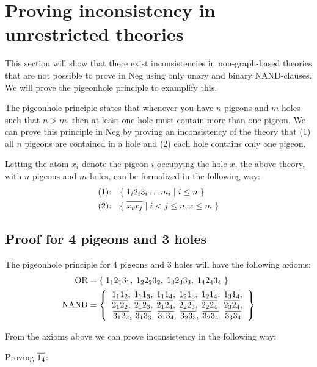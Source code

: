 \section{Proving inconsistency in unrestricted theories}
\label{sec:Proving inconsistency in unrestricted theories}
This section will show that there exist inconsistencies in non-graph-based theories that are not possible to prove in Neg using only unary and binary NAND-clauses.
We will prove the pigeonhole principle to examplify this.

The pigeonhole principle states that whenever you have $n$ pigeons and $m$ holes such that $n > m$, then at least one hole must contain more than one pigeon.
We can prove this principle in Neg by proving an inconsistency of the theory that (1) all $n$ pigeons are contained in a hole and (2) each hole contains only one pigeon.

Letting the atom $x_i$ denote the pigeon $i$ occupying the hole $x$, the above theory, with $n$ pigeons and $m$ holes, can be formalized in the following way:
\begin{align}
  \text{(1):}\quad &\{ \; 1_i2_i3_i\dots m_i \;|\; i \leq n \; \}\\
  \text{(2):}\quad &\{ \; \ol{x_ix_j} \;|\; i < j \leq n, x \leq m \; \}
\end{align}
\subsection{Proof for 4 pigeons and 3 holes}
\label{sub:Proof for 4 pigeons and 3 holes}
The pigeonhole principle for 4 pigeons and 3 holes will have the following axioms:
\begin{align}
  \text{OR} &= \{ \; 1_12_13_1,\; 1_22_23_2,\; 1_32_33_3,\; 1_42_43_4 \; \}\\
  \text{NAND} &= \left \{
  \begin{tabular}{c}
    $\ol{1_11_2},\;\ol{1_11_3},\;\ol{1_11_4},\;\ol{1_21_3},\;\ol{1_21_4},\;\ol{1_31_4},$\\
    $\ol{2_12_2},\;\ol{2_12_3},\;\ol{2_12_4},\;\ol{2_22_3},\;\ol{2_22_4},\;\ol{2_32_4},$\\
    $\ol{3_12_2},\;\ol{3_13_3},\;\ol{3_13_4},\;\ol{3_23_3},\;\ol{3_23_4},\;\ol{3_33_4}$
  \end{tabular}
  \right \}
\end{align}

From the axioms above we can prove inconsistency in the following way:

Proving $\ol{1_4}$:
\begin{prooftree*}[separation=0.8em, rule margin=1ex]
\end{prooftree*}

